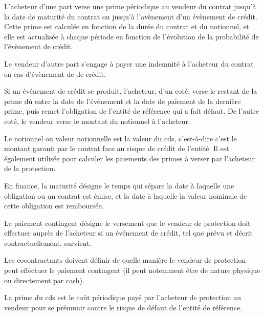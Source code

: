 L'acheteur d'une part verse une prime périodique au vendeur du contrat jusqu'à la date de maturité du contrat ou jusqu'à l'avènement d'un évènement de crédit. Cette prime est calculée en fonction de la durée du contrat et du notionnel, et elle est actualisée à chaque période en fonction de l'évolution de la probabilité de l'évènement de crédit.

Le vendeur d'autre part s'engage à payer une indemnité à l'acheteur du contrat en cas d'évènement de de crédit. 

Si un événement de crédit se produit, l'acheteur, d'un coté, verse le restant de la prime dû entre la date de l'événement et la date de paiement de la dernière prime, puis remet l'obligation de l'entité de référence qui a fait défaut. 
De l'autre coté, le vendeur verse le montant du notionnel à l'acheteur.


\begin{definition}\label{def:valeur_notionnelle}
Le notionnel ou valeur notionnelle est la valeur du \gls{cds}, c'est-à-dire c'est le montant garanti par le contrat face au risque de crédit de l'entité. Il est également utilisée pour calculer les paiements des primes à verser par l'acheteur de la protection.
\end{definition}


\begin{definition}\label{def:maturite}
En finance, la maturité désigne le temps qui sépare la date à laquelle une obligation ou un contrat est émise, et la date à laquelle la valeur nominale de cette obligation est remboursée.
\end{definition}


\begin{definition}\label{def:paiement_contingent}
Le paiement contingent désigne le versement que le vendeur de protection doit effectuer auprès de l'acheteur si un événement de crédit, tel que prévu et décrit contractuellement, survient.
\end{definition}

Les cocontractants doivent définir de quelle manière le vendeur de protection peut effectuer le paiement contingent (il peut notemment être de nature physique ou directement par cash).


\begin{definition}\label{def:prime}
La prime du \gls{cds} est le coût périodique payé par l'acheteur de protection au vendeur pour se prémunir contre le risque de défaut de l'entité de référence.
\end{definition}


